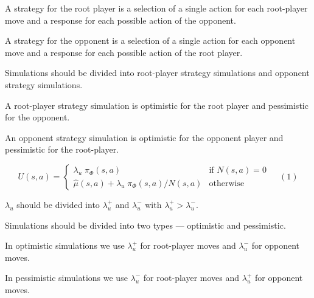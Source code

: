 {\vfill
A strategy for the root player is a selection of a single action for each root-player move and a response for each possible action
of the opponent.

\vfill
A strategy for the opponent is a selection of a single action for each opponent move and a response for each possible action
of the root player.


Simulations should be divided into root-player strategy simulations and opponent strategy simulations.

\vfill
A root-player strategy simulation is optimistic for the root player and pessimistic for the opponent.

\vfill
An opponent strategy simulation is optimistic for the opponent player and pessimistic for the root-player.


$$U(s,a) =  \left\{\begin{array}{ll}\lambda_u \; \pi_\Phi(s,a) &\mbox{if $N(s,a) = 0$}
\\ \hat{\mu}(s,a) + \lambda_u\; \pi_\Phi(s,a)/N(s,a) & \mbox{otherwise} \end{array}\right. \;\;\;\;(1)$$

\vfill
$\lambda_u$ should be divided into $\lambda_u^+$ and $\lambda_u^-$ with $\lambda_u^+ > \lambda_u^-$.

\vfill
Simulations should be divided into two types --- optimistic and pessimistic.

\vfill
In optimistic simulations we use $\lambda_u^+$ for root-player moves and $\lambda_u^-$ for opponent moves.

\vfill
In pessimistic simulations we use $\lambda_u^-$ for root-player moves and $\lambda_u^+$ for opponent moves.


}




